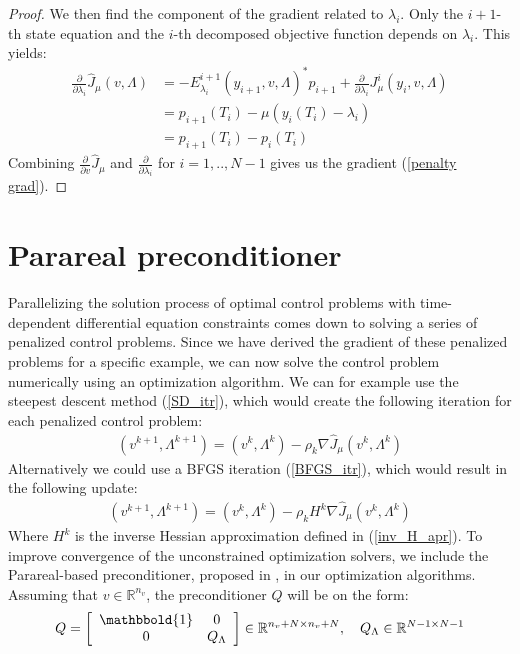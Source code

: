 \begin{proof}
We then find the component of the gradient related to $\lambda_i$. Only the $i+1$-th state equation and the $i$-th decomposed objective function depends on $\lambda_i$. This yields:
\begin{align*}
\frac{\partial}{\partial \lambda_i} \hat J_{\mu}(v,\Lambda) &= -E_{\lambda_i}^{i+1}(y_{i+1},v,\Lambda)^* p_{i+1} +  \frac{\partial}{\partial \lambda_i} J_{\mu}^i(y_i,v,\Lambda) \\
&= p_{i+1}(T_i)-\mu (y_{i}(T_i)-\lambda_i)\\
 &= p_{i+1}(T_i)-p_i(T_i)
\end{align*}
Combining $\frac{\partial}{\partial v} \hat J_{\mu}$ and $ \frac{\partial}{\partial \lambda_i}$ for $i=1,..,N-1$ gives us the gradient (\ref{penalty grad}).
\end{proof} 
\section{Parareal preconditioner} \label{pc sec}
Parallelizing the solution process of optimal control problems with time-dependent differential equation constraints comes down to solving a series of penalized control problems. Since we have derived the gradient of these penalized problems for a specific example, we can now solve the control problem numerically using an optimization algorithm. We can for example use the steepest descent method (\ref{SD_itr}), which would create the following iteration for each penalized control problem:
\begin{align}
(v^{k+1},\Lambda^{k+1}) = (v^{k},\Lambda^{k}) -\rho_k\nabla\hat{J}_{\mu}(v^{k},\Lambda^{k}) \label{gradient_method}
\end{align}
Alternatively we could use a BFGS iteration (\ref{BFGS_itr}), which would result in the following update:
\begin{align}
(v^{k+1},\Lambda^{k+1}) = (v^{k},\Lambda^{k}) -\rho_kH^{k}\nabla\hat{J}_{\mu}(v^{k},\Lambda^{k}) \label{bfgs_method}
\end{align}
Where $H^k$ is the inverse Hessian approximation defined in (\ref{inv_H_apr}). To improve convergence of the unconstrained optimization solvers, we include the Parareal-based preconditioner, proposed in \cite{maday2002parareal}, in our optimization algorithms. Assuming that $v\in\mathbb{R}^{n_v}$, the preconditioner $Q$ will be on the form:
\begin{align}
Q = \left[ \begin{array}{cc}
	\mathbbold{1} & 0 \\
	0 & Q_{\Lambda} \\
	\end{array} \right]\in \mathbb{R}^{n_v+N\times n_v+N},\quad Q_{\Lambda}\in\mathbb{R}^{N-1\times N-1} \label{PC_form}
\end{align} 

